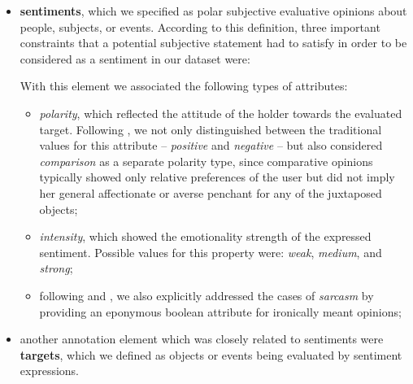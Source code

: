 \begin{itemize}
\item
  \textbf{sentiments}, which we specified as polar subjective
  evaluative opinions about people, subjects, or events. According to
  this definition, three important constraints that a potential
  subjective statement had to satisfy in order to be considered as a
  sentiment in our dataset were:

  With this element we associated the following types of attributes:
  \begin{itemize}
    \item
      \emph{polarity}, which reflected the attitude of the holder
      towards the evaluated target.  Following
      \citet{Jindal:06a,Jindal:06b}, we not only distinguished between
      the traditional values for this attribute -- \emph{positive} and
      \emph{negative} -- but also considered \emph{comparison} as a
      separate polarity type, since comparative opinions typically
      showed only relative preferences of the user but did not imply
      her general affectionate or averse penchant for any of the
      juxtaposed objects;
    \item
      \emph{intensity}, which showed the emotionality strength of the
      expressed sentiment.  Possible values for this property were:
      \emph{weak}, \emph{medium}, and \emph{strong};
    \item
      following \citet{Bosco:13} and \citet{Rosenthal:14}, we also
      explicitly addressed the cases of \emph{sarcasm} by providing an
      eponymous boolean attribute for ironically meant opinions;
  \end{itemize}

\item
  another annotation element which was closely related to sentiments
  were \textbf{targets}, which we defined as objects or events being
  evaluated by sentiment expressions.


\end{itemize}
